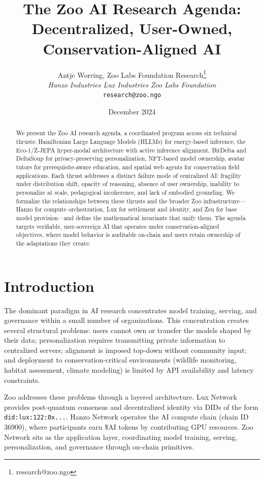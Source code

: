 \documentclass[11pt,letterpaper]{article}
\title{\textbf{The Zoo AI Research Agenda:\\Decentralized, User-Owned, Conservation-Aligned AI}}
\author{
Antje Worring, Zoo Labs Foundation Research\thanks{research@zoo.ngo}\\
\textit{Hanzo Industries \quad Lux Industries \quad Zoo Labs Foundation}\\
\texttt{research@zoo.ngo}
}
\date{December 2024}
\begin{document}
\zoocoverpage

\begin{abstract}
We present the Zoo AI research agenda, a coordinated program across six technical thrusts: Hamiltonian Large Language Models (HLLMs) for energy-based inference, the Eco-1/Z-JEPA hyper-modal architecture with active inference alignment, BitDelta and DeltaSoup for privacy-preserving personalization, NFT-based model ownership, avatar tutors for prerequisite-aware education, and spatial web agents for conservation field applications. Each thrust addresses a distinct failure mode of centralized AI: fragility under distribution shift, opacity of reasoning, absence of user ownership, inability to personalize at scale, pedagogical incoherence, and lack of embodied grounding. We formalize the relationships between these thrusts and the broader Zoo infrastructure---Hanzo for compute orchestration, Lux for settlement and identity, and Zen for base model provision---and define the mathematical invariants that unify them. The agenda targets verifiable, user-sovereign AI that operates under conservation-aligned objectives, where model behavior is auditable on-chain and users retain ownership of the adaptations they create.
\end{abstract}

\section{Introduction}

The dominant paradigm in AI research concentrates model training, serving, and governance within a small number of organizations. This concentration creates several structural problems: users cannot own or transfer the models shaped by their data; personalization requires transmitting private information to centralized servers; alignment is imposed top-down without community input; and deployment to conservation-critical environments (wildlife monitoring, habitat assessment, climate modeling) is limited by API availability and latency constraints.

Zoo addresses these problems through a layered architecture. Lux Network provides post-quantum consensus and decentralized identity via DIDs of the form \texttt{did:lux:122:0x...}. Hanzo Network operates the AI compute chain (chain ID 36900), where participants earn \$AI tokens by contributing GPU resources. Zoo Network sits as the application layer, coordinating model training, serving, personalization, and governance through on-chain primitives.
\end{document}
